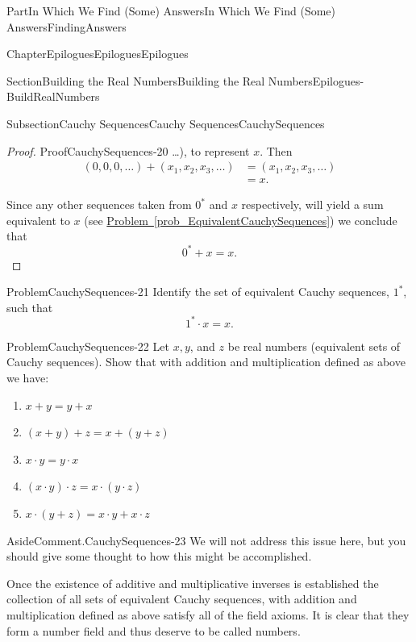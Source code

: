 \documentclass[oneside,10pt,]{book}
\newcommand{\xreffont}{\relax}
\numberwithin{equation}{part}
\newcommand{\amp}{&}
\begin{document}
\begin{partptx}{Part}{In Which We Find (Some) Answers}{}{In Which We Find (Some) Answers}{}{}{FindingAnswers}
\begin{chapterptx}{Chapter}{Epilogues}{}{Epilogues}{}{}{Epilogues}
\begin{sectionptx}{Section}{Building the Real Numbers}{}{Building the Real Numbers}{}{}{Epilogues-BuildRealNumbers}
\begin{subsectionptx}{Subsection}{Cauchy Sequences}{}{Cauchy Sequences}{}{}{CauchySequences}
\begin{proof}{Proof}{}{CauchySequences-20}
\ldots)\), to represent \(x\).  Then%
\begin{align*}
(0, 0, 0, \ldots) + (x_1, x_2, x_3, \ldots) \amp = (x_1, x_2, x_3, \ldots)\\
\amp = x\text{.}
\end{align*}
%
\par
Since any other sequences taken from \(0^*\) and \(x\) respectively, will yield a sum equivalent to \(x\) (see \hyperref[prob_EquivalentCauchySequences]{Problem~{\xreffont\ref{prob_EquivalentCauchySequences}}}) we conclude that%
\begin{equation*}
0^*+x=x\text{.}
\end{equation*}
%
\end{proof}
\begin{problem}{Problem}{}{CauchySequences-21}%
Identify the set of equivalent Cauchy sequences, \(1^*\), such that%
\begin{equation*}
1^*\cdot x=x\text{.}
\end{equation*}
%
\end{problem}
\begin{problem}{Problem}{}{CauchySequences-22}%
Let \(x, y\), and \(z\) be real numbers (equivalent sets of Cauchy sequences). Show that with addition and multiplication defined as above we have:%
\begin{enumerate}[font=\bfseries,label=(\alph*),ref=\alph*]%
\item{}\(x+y=y+x\)%
\item{}\((x+y)+z=x+(y+z)\)%
\item{}\(x\cdot y=y\cdot x\)%
\item{}\((x\cdot y)\cdot z=x\cdot (y\cdot z)\)%
\item{}\(x\cdot(y+z)=x\cdot y+x\cdot z\)%
\end{enumerate}%
\end{problem}
\begin{aside}{Aside}{Comment.}{CauchySequences-23}%
We will not address this issue here, but you should give some thought to how this might be accomplished.%
\end{aside}
Once the existence of additive and multiplicative inverses is established the collection of all sets of equivalent Cauchy sequences, with addition and multiplication defined as above satisfy all of the field axioms.  It is clear that they form a number field and thus deserve to be called numbers.%
\par

\end{subsectionptx}
\end{sectionptx}
\end{chapterptx}
\end{partptx}
\end{document}
